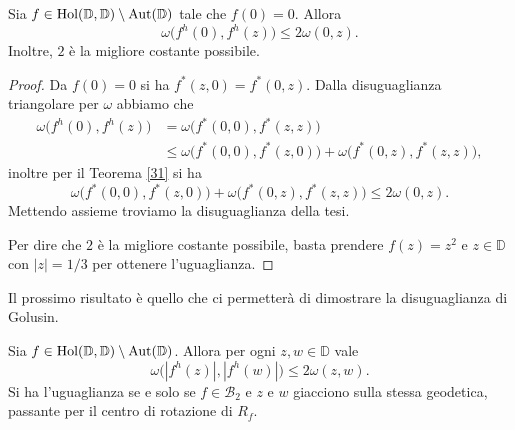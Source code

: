 \begin{cor} \label{36}
  Sia $f \in \text{\normalfont{Hol}}(\mathbb{D},\mathbb{D})\setminus\text{\normalfont{Aut}}(\mathbb{D})$ tale che $f(0)=0$. Allora
  \begin{equation}
    \omega\bigl(f^h(0),f^h(z)\bigr) \le 2\omega(0,z).
  \end{equation}
  Inoltre, $2$ è la migliore costante possibile.
\end{cor}

\begin{proof}
  Da $f(0)=0$ si ha $f^*(z,0)=f^*(0,z)$. Dalla disuguaglianza triangolare per $\omega$ abbiamo che
  \begin{align*}
    \omega\bigl(f^h(0),f^h(z)\bigr) & = \omega\bigl(f^*(0,0),f^*(z,z)\bigr) \\
    & \le \omega\bigl(f^*(0,0),f^*(z,0)\bigr)+\omega\bigl(f^*(0,z),f^*(z,z)\bigr),
  \end{align*}
  inoltre per il Teorema \ref{31} si ha
  $$\omega\bigl(f^*(0,0),f^*(z,0)\bigr)+\omega\bigl(f^*(0,z),f^*(z,z)\bigr)\le 2\omega(0,z).$$
  Mettendo assieme troviamo la disuguaglianza della tesi.

  Per dire che $2$ è la migliore costante possibile, basta prendere $f(z)=z^2$ e $z \in \mathbb{D}$ con $|z|=1/3$ per ottenere l'uguaglianza.
\end{proof}

Il prossimo risultato è quello che ci permetterà di dimostrare la disuguaglianza di Golusin.

\begin{cor} \label{quasigolusin}
  Sia $f \in \text{\normalfont{Hol}}(\mathbb{D},\mathbb{D})\setminus\text{\normalfont{Aut}}(\mathbb{D})$. Allora per ogni $z, w \in \mathbb{D}$ vale
  \begin{equation} \label{quasigol}
    \omega\bigl(|f^h(z)|, |f^h(w)|\bigr) \le 2\omega(z,w).
  \end{equation}
  Si ha l'uguaglianza se e solo se $f \in \mathcal{B}_2$ e $z$ e $w$ giacciono sulla stessa geodetica, passante per il centro di rotazione di $R_f$.
\end{cor}

